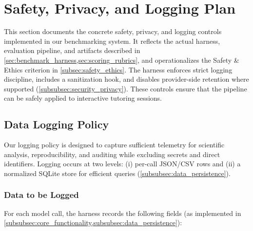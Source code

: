 \section{Safety, Privacy, and Logging Plan}\label{sec:safety}

This section documents the concrete safety, privacy, and logging controls implemented in our benchmarking system. It reflects the actual harness, evaluation pipeline, and artifacts described in \cref{sec:benchmark_harness,sec:scoring_rubrics}, and operationalizes the Safety \& Ethics criterion in \cref{subsec:safety_ethics}. The harness enforces strict logging discipline, includes a sanitization hook, and disables provider-side retention where supported (\cref{subsubsec:security_privacy}). These controls ensure that the pipeline can be safely applied to interactive tutoring sessions.

\subsection{Data Logging Policy}\label{subsec:data_logging_policy}

Our logging policy is designed to capture sufficient telemetry for scientific analysis, reproducibility, and auditing while excluding secrets and direct identifiers. Logging occurs at two levels: (i) per-call JSON/CSV rows and (ii) a normalized SQLite store for efficient queries (\cref{subsubsec:data_persistence}).

\subsubsection{Data to be Logged}\label{subsubsec:data_logged}

For each model call, the harness records the following fields (as implemented in \cref{subsubsec:core_functionality,subsubsec:data_persistence}):

